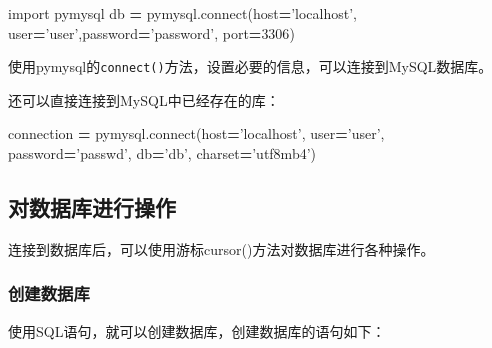\documentclass[]{ctexbook}
\newenvironment{Shaded}{\begin{snugshade}}{\end{snugshade}}
\newcommand{\DecValTok}[1]{\textcolor[rgb]{0.00,0.00,0.81}{#1}}
\newcommand{\ExtensionTok}[1]{#1}
\newcommand{\ImportTok}[1]{#1}
\newcommand{\NormalTok}[1]{#1}
\newcommand{\OperatorTok}[1]{\textcolor[rgb]{0.81,0.36,0.00}{\textbf{#1}}}
\newcommand{\StringTok}[1]{\textcolor[rgb]{0.31,0.60,0.02}{#1}}
\begin{document}
\begin{Shaded}
\begin{Highlighting}[]
\ImportTok{import}\NormalTok{ pymysql}
\NormalTok{db }\OperatorTok{=}\NormalTok{ pymysql.}\ExtensionTok{connect}\NormalTok{(host}\OperatorTok{=}\StringTok{'localhost'}\NormalTok{, user}\OperatorTok{=}\StringTok{'user'}\NormalTok{,password}\OperatorTok{=}\StringTok{'password'}\NormalTok{, port}\OperatorTok{=}\DecValTok{3306}\NormalTok{)}
\end{Highlighting}
\end{Shaded}

使用pymysql的\texttt{connect()}方法，设置必要的信息，可以连接到MySQL数据库。

还可以直接连接到MySQL中已经存在的库：

\begin{Shaded}
\begin{Highlighting}[]
\NormalTok{connection }\OperatorTok{=}\NormalTok{ pymysql.}\ExtensionTok{connect}\NormalTok{(host}\OperatorTok{=}\StringTok{'localhost'}\NormalTok{,}
\NormalTok{                             user}\OperatorTok{=}\StringTok{'user'}\NormalTok{,}
\NormalTok{                             password}\OperatorTok{=}\StringTok{'passwd'}\NormalTok{,}
\NormalTok{                             db}\OperatorTok{=}\StringTok{'db'}\NormalTok{,}
\NormalTok{                             charset}\OperatorTok{=}\StringTok{'utf8mb4'}\NormalTok{)}
\end{Highlighting}
\end{Shaded}

\hypertarget{ux5bf9ux6570ux636eux5e93ux8fdbux884cux64cdux4f5c}{%
\subsection{对数据库进行操作}\label{ux5bf9ux6570ux636eux5e93ux8fdbux884cux64cdux4f5c}}

连接到数据库后，可以使用游标cursor()方法对数据库进行各种操作。

\hypertarget{ux521bux5efaux6570ux636eux5e93}{%
\subsubsection{创建数据库}\label{ux521bux5efaux6570ux636eux5e93}}

使用SQL语句，就可以创建数据库，创建数据库的语句如下：
\end{document}
